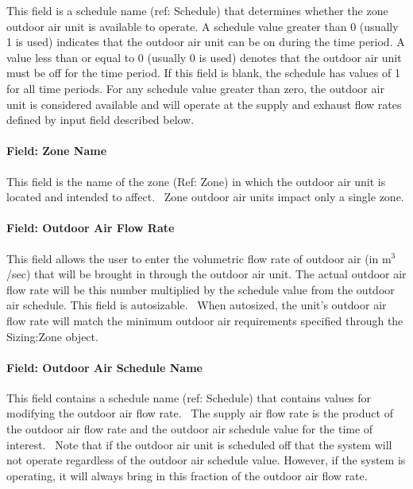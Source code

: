 This field is a schedule name (ref: Schedule) that determines whether the zone outdoor air unit is available to operate. A schedule value greater than 0 (usually 1 is used) indicates that the outdoor air unit can be on during the time period. A value less than or equal to 0 (usually 0 is used) denotes that the outdoor air unit must be off for the time period. If this field is blank, the schedule has values of 1 for all time periods. For any schedule value greater than zero, the outdoor air unit is considered available and will operate at the supply and exhaust flow rates defined by input field described below.

\paragraph{Field: Zone Name}\label{field-zone-name-016}

This field is the name of the zone (Ref: Zone) in which the outdoor air unit is located and intended to affect.~ Zone outdoor air units impact only a single zone.

\paragraph{Field: Outdoor Air Flow Rate}\label{field-outdoor-air-flow-rate}

This field allows the user to enter the volumetric flow rate of outdoor air (in m\(^{3}\)/sec) that will be brought in through the outdoor air unit. The actual outdoor air flow rate will be this number multiplied by the schedule value from the outdoor air schedule. This field is autosizable.~ When autosized, the unit's outdoor air flow rate will match the minimum outdoor air requirements specified through the Sizing:Zone object.

\paragraph{Field: Outdoor Air Schedule Name}\label{field-outdoor-air-schedule-name-1}

This field contains a schedule name (ref: Schedule) that contains values for modifying the outdoor air flow rate.~ The supply air flow rate is the product of the outdoor air flow rate and the outdoor air schedule value for the time of interest. ~Note that if the outdoor air unit is scheduled off that the system will not operate regardless of the outdoor air schedule value. However, if the system is operating, it will always bring in this fraction of the outdoor air flow rate.

